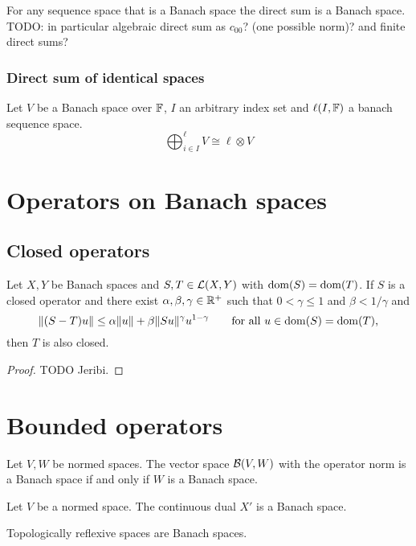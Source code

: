 \begin{proposition}
For any sequence space that is a Banach space the direct sum is a Banach space. TODO: in particular algebraic direct sum as $c_{00}$? (one possible norm)? and finite direct sums?
\end{proposition}

\subsubsection{Direct sum of identical spaces}
\begin{proposition}
Let $V$ be a Banach space over $\mathbb{F}$, $I$ an arbitrary index set and $\ell(I,\mathbb{F})$ a banach sequence space.
\[ \bigoplus_{i\in I}^\ell V \cong \ell\otimes V \]
\end{proposition}


\section{Operators on Banach spaces}
\subsection{Closed operators}
\begin{proposition}
Let $X,Y$ be Banach spaces and $S,T\in \operatorname{\mathcal{L}}(X,Y)$ with $\operatorname{dom}(S) = \operatorname{dom}(T)$. If $S$ is a closed operator and there exist $\alpha,\beta,\gamma\in \mathbb{R}^+$ such that $0 < \gamma \leq 1$ and $\beta < 1/\gamma$ and
\[ \lVert(S-T)u\rVert \leq \alpha \lVert u\rVert + \beta\lVert Su\rVert^\gamma{u}^{1-\gamma} \qquad\text{for all $u\in \operatorname{dom}(S) = \operatorname{dom}(T)$,} \]
then $T$ is also closed.
\end{proposition}
\begin{proof}
TODO Jeribi.
\end{proof}

\section{Bounded operators}
\begin{proposition}
Let $V,W$ be normed spaces. The vector space $\operatorname{\mathcal{B}}(V,W)$ with the operator norm is a Banach space \textup{if and only if} $W$ is a Banach space.
\end{proposition}
\begin{corollary}
Let $V$ be a normed space. The continuous dual $X'$ is a Banach space.
\end{corollary}
\begin{corollary}
Topologically reflexive spaces are Banach spaces.
\end{corollary}

